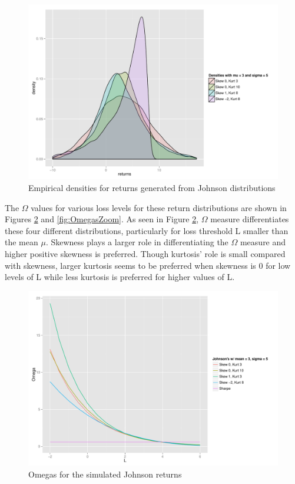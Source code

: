 \documentclass[paper=a4, fontsize=11pt]{scrartcl}
\begin{document}
\begin{figure}[H]
\begin{center}
\includegraphics[width=6in]{plots/Densities.pdf}
\caption{Empirical densities for returns generated from Johnson distributions}
\label{fig:Densities}
\end{center}
\end{figure}

The $\Omega$ values for various loss levels for these return distributions are shown in Figures \ref{fig:Omegas} and \ref{fig:OmegasZoom}. 
As seen in Figure \ref{fig:Omegas}, $\Omega$ measure differentiates these four different distributions, particularly for loss threshold L
smaller than the mean $\mu$. Skewness plays a larger role in differentiating the $\Omega$ measure and higher positive skewness is preferred.
Though kurtosis' role is small compared with skewness, larger kurtosis seems to be preferred when skewness is 0 for low levels of L while less kurtosis is
preferred for higher values of L.

\begin{figure}[H]
\begin{center}
\includegraphics[width=4.5in]{plots/Preferences.pdf}
\caption{Omegas for the simulated Johnson returns}
\label{fig:Omegas}
\end{center}
\end{figure}
\end{document}
